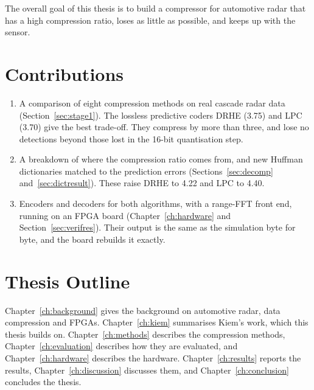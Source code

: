 The overall goal of this thesis is to build a compressor for automotive radar that has a high compression ratio, loses as little as possible, and keeps up with the sensor.

\section{Contributions}
\label{sec:contributions}

\begin{enumerate}
\item A comparison of eight compression methods on real cascade radar data
(Section~\ref{sec:stage1}). The lossless predictive coders DRHE (\num{3.75})
and LPC (\num{3.70}) give the best trade-off. They compress by more than three,
and lose no detections beyond those lost in the 16-bit quantisation step.
\item A breakdown of where the compression ratio comes from, and new Huffman
dictionaries matched to the prediction errors (Sections~\ref{sec:decomp}
and~\ref{sec:dictresult}). These raise DRHE to \num{4.22} and LPC to
\num{4.40}.
\item Encoders and decoders for both algorithms, with a range-FFT front end,
running on an FPGA board (Chapter~\ref{ch:hardware} and
Section~\ref{sec:verifres}). Their output is the same as the simulation byte
for byte, and the board rebuilds it exactly.
\end{enumerate}

\section{Thesis Outline}
\label{sec:structure}

Chapter~\ref{ch:background} gives the background on automotive radar, data
compression and FPGAs. Chapter~\ref{ch:kiem} summarises Kiem's work, which
this thesis builds on. Chapter~\ref{ch:methods} describes the compression
methods, Chapter~\ref{ch:evaluation} describes how they are evaluated, and
Chapter~\ref{ch:hardware} describes the hardware. Chapter~\ref{ch:results}
reports the results, Chapter~\ref{ch:discussion} discusses them, and
Chapter~\ref{ch:conclusion} concludes the thesis.
